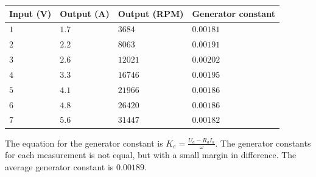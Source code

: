 \begin{table}[H]
\begin{tabular}{|l|l|l|l|}
\hline%
  \textbf{Input (V)}  & \textbf{Output (A)} & \textbf{Output (RPM)} & \textbf{Generator constant} \\
\hline%
  $1$                 &            $1.7$  &  $3684$ & $0.00181$                 \\
\hline%
  $2$                 &            $2.2$  &  $8063$ & $0.00191$                 \\
\hline%
  $3$                 &            $2.6$  &  $12021$ & $0.00202$                \\
\hline%
  $4$                 &            $3.3$  &  $16746$ & $0.00195$                \\
\hline%
  $5$                 &            $4.1$  &  $21966$ & $0.00186$                \\
\hline%
  $6$                 &            $4.8$  &  $26420$ & $0.00186$                \\
\hline%
  $7$                 &            $5.6$  &  $31447$ & $0.00182$                \\
\hline%
\end{tabular}
\end{table}

The equation for the generator constant is $K_e = \frac{U_a - R_a I_a}{\omega}$. The generator constants for each measurement is not equal, but with a small margin in difference. The average generator constant is $0.00189$.